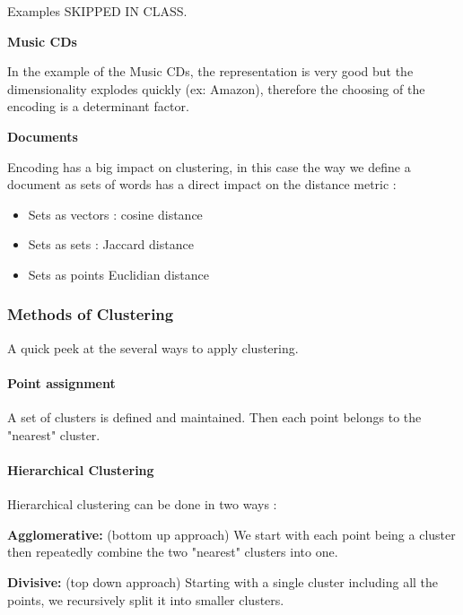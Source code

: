 Examples SKIPPED IN CLASS.

\textbf{Music CDs}

In the example of the Music CDs, the representation is very good but the dimensionality explodes quickly (ex: Amazon), therefore the choosing of the encoding is a determinant factor. 

\textbf{Documents}

Encoding has a big impact on clustering, in this case the way we define a document as sets of words has a direct impact on the distance metric :
\begin{itemize}
	\item Sets as vectors : cosine distance
	\item Sets as sets : Jaccard distance
	\item Sets as points Euclidian distance
\end{itemize}

\subsubsection{Methods of Clustering}
A quick peek at the several ways to apply clustering.

\paragraph{Point assignment}

A set of clusters is defined and maintained. Then each point belongs to the "nearest" cluster.

\paragraph{Hierarchical Clustering}

Hierarchical clustering can be done in two ways :

\textbf{Agglomerative: } (bottom up approach) We start with each point being a cluster then repeatedly combine the  two "nearest" clusters into one.

\textbf{Divisive: } (top down approach) Starting with a single cluster including all the points, we recursively split it into smaller clusters.

